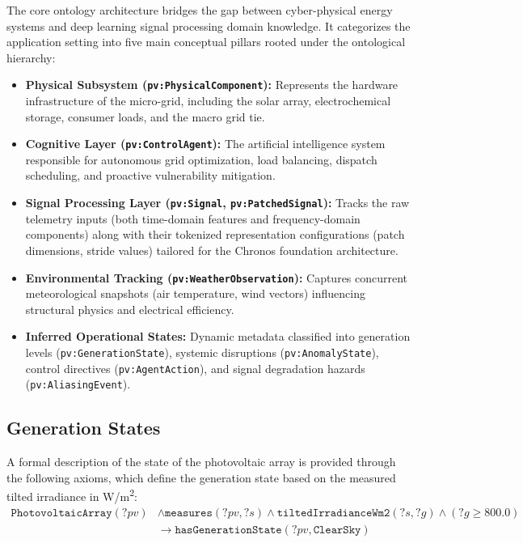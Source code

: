 The core ontology architecture bridges the gap between cyber-physical energy systems and deep learning signal processing domain knowledge. It categorizes the application setting into five main conceptual pillars rooted under the ontological hierarchy:

\begin{itemize}
    \item \textbf{Physical Subsystem (\texttt{pv:PhysicalComponent}):} Represents the hardware infrastructure of the micro-grid, including the solar array, electrochemical storage, consumer loads, and the macro grid tie.
    \item \textbf{Cognitive Layer (\texttt{pv:ControlAgent}):} The artificial intelligence system responsible for autonomous grid optimization, load balancing, dispatch scheduling, and proactive vulnerability mitigation.
    \item \textbf{Signal Processing Layer (\texttt{pv:Signal}, \texttt{pv:PatchedSignal}):} Tracks the raw telemetry inputs (both time-domain features and frequency-domain components) along with their tokenized representation configurations (patch dimensions, stride values) tailored for the Chronos foundation architecture.
    \item \textbf{Environmental Tracking (\texttt{pv:WeatherObservation}):} Captures concurrent meteorological snapshots (air temperature, wind vectors) influencing structural physics and electrical efficiency.
    \item \textbf{Inferred Operational States:} Dynamic metadata classified into generation levels
    (\texttt{pv:GenerationState}), systemic disruptions (\texttt{pv:AnomalyState}), control directives
    (\texttt{pv:AgentAction}), and signal degradation hazards (\texttt{pv:AliasingEvent}).
\end{itemize}

\subsection{Generation States}
A formal description of the state of the photovoltaic array is provided through the following axioms, which define the generation state based on the measured tilted irradiance in W/m\textsuperscript{2}:
\begin{equation}
\begin{aligned}
\texttt{PhotovoltaicArray}(?pv) &\wedge \texttt{measures}(?pv, ?s) \wedge \texttt{tiltedIrradianceWm2}(?s, ?g) \wedge (?g \ge 800.0) \\
&\longrightarrow \texttt{hasGenerationState}(?pv, \texttt{ClearSky})
\end{aligned}
\end{equation}


